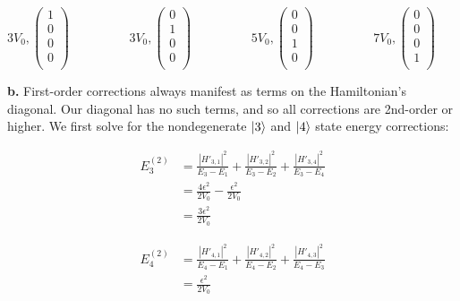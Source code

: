 \documentclass[10pt]{article} %
\begin{document}
\begin{equation*}
  3V_0,
  \begin{pmatrix}
    1 \\ 0 \\ 0 \\ 0\\
  \end{pmatrix}
  \hspace{2cm}
  3V_0,
  \begin{pmatrix}
    0 \\ 1 \\ 0 \\ 0\\
  \end{pmatrix}
  \hspace{2cm}
  5V_0,
  \begin{pmatrix}
    0 \\ 0 \\ 1 \\ 0\\
  \end{pmatrix}
  \hspace{2cm}
  7V_0,
  \begin{pmatrix}
    0 \\ 0 \\ 0 \\ 1\\
  \end{pmatrix}
  \hspace{2cm}
\end{equation*}

\textbf{b.}
First-order corrections always manifest as terms on the Hamiltonian's diagonal. Our diagonal has
no such terms, and so all corrections are 2nd-order or higher. We first solve for the nondegenerate
$\ket{3}$ and $\ket{4}$ state energy corrections:

\begin{align*}
  E_3^{(2)} &=
  \frac{|H'_{3,1}|^2}{E_3 - E_1} +
  \frac{|H'_{3,2}|^2}{E_3 - E_2} +
  \frac{|H'_{3,4}|^2}{E_3 - E_4}\\
  &= \frac{4\epsilon^2}{2V_0} - \frac{\epsilon^2}{2V_0}\\
  &= \frac{3\epsilon^2}{2V_0}
\end{align*}

\begin{align*}
  E_4^{(2)} &=
  \frac{|H'_{4,1}|^2}{E_4 - E_1} +
  \frac{|H'_{4,2}|^2}{E_4 - E_2} +
  \frac{|H'_{4,3}|^2}{E_4 - E_3}\\
  &= \frac{\epsilon^2}{2V_0}
\end{align*}
\end{document}
